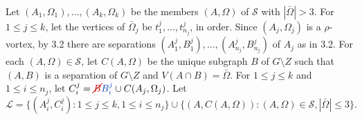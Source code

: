 Let $(A_1, \Omega_1), \dots, (A_k, \Omega_k)$ be the members $(A, \Omega)$ of $\mathcal{S}$ with $|\bar{\Omega}| > 3$. For $1 \le j \le k$, let the vertices of $\bar{\Omega}_j$ be $t_1^j, \dots, t_{n_j}^j$, in order. Since $(A_j, \Omega_j)$ is a $\rho$-vortex, by 3.2 there are separations $(A_1^j, B_1^j), \dots, (A_{n_j}^j, B_{n_j}^j)$ of $A_j$ as in 3.2. For each $(A, \Omega) \in \mathcal{S}$, let $C(A, \Omega)$ be the unique subgraph $B$ of $G \setminus Z$ such that $(A, B)$ is a separation of $G \setminus Z$ and $V(A \cap B) = \bar{\Omega}$. For $1 \le j \le k$ and $1 \le i \le n_j$, let $C_i^j = \delm{B}\fix{B_i^j} \cup C(A_j, \Omega_j)$. Let
\begin{equation*}
\mathcal{L} = \{(A_i^j, C_i^j) : 1 \le j \le k, 1 \le i \le n_j\} \cup \{(A, C(A, \Omega)) : (A, \Omega) \in \mathcal{S}, |\bar{\Omega}| \le 3\}.
\end{equation*}
